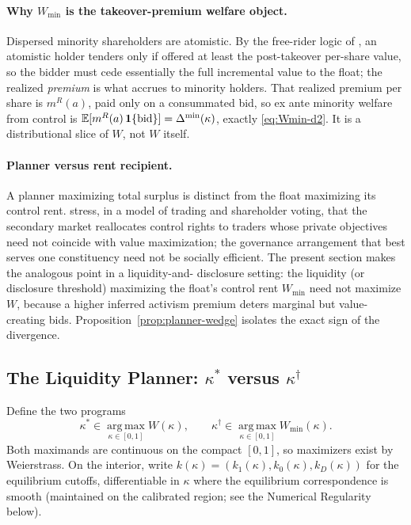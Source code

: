 \documentclass[11pt]{article}
\newcommand{\E}{\mathbb{E}}
\newcommand{\1}{\mathbf{1}}
\begin{document}
\paragraph{Why $W_{\min}$ is the takeover-premium welfare object.}
Dispersed minority shareholders are atomistic. By the free-rider logic of
\citet{GrossmanHart1980}, an atomistic holder tenders only if offered at least
the post-takeover per-share value, so the bidder must cede essentially the full
incremental value to the float; the realized \emph{premium} is what accrues to
minority holders. That realized premium per share is $m^{R}(a)$, paid only on a
consummated bid, so ex ante minority welfare from control is
$\E[m^{R}(a)\,\1\{\textup{bid}\}]=\Delta^{\min}(\kappa)$, exactly
\eqref{eq:Wmin-d2}. It is a distributional slice of $W$, not $W$ itself.

\paragraph{Planner versus rent recipient.}
A planner maximizing total surplus is distinct from the float maximizing its
control rent. \citet{LevitMalenkoMaug2024} stress, in a model of trading and
shareholder voting, that the secondary market reallocates control rights to
traders whose private objectives need not coincide with value maximization; the
governance arrangement that best serves one constituency need not be socially
efficient. The present section makes the analogous point in a liquidity-and-%
disclosure setting: the liquidity (or disclosure threshold) maximizing the
float's control rent $W_{\min}$ need not maximize $W$, because a higher inferred
activism premium deters marginal but value-creating bids.
Proposition~\ref{prop:planner-wedge} isolates the exact sign of the divergence.

\subsection{The Liquidity Planner: $\kappa^{\ast}$ versus $\kappa^{\dagger}$}
\label{sec:welf-kappa}

Define the two programs
\begin{equation}
\kappa^{\ast}\in\operatorname*{arg\,max}_{\kappa\in[0,1]}W(\kappa),\qquad
\kappa^{\dagger}\in\operatorname*{arg\,max}_{\kappa\in[0,1]}W_{\min}(\kappa).
\label{eq:two-programs}
\end{equation}
Both maximands are continuous on the compact $[0,1]$, so maximizers exist by
Weierstrass. On the interior, write $k(\kappa)=(k_1(\kappa),k_0(\kappa),
k_D(\kappa))$ for the equilibrium cutoffs, differentiable in $\kappa$ where the
equilibrium correspondence is smooth (maintained on the calibrated region; see
the Numerical Regularity below).
\end{document}
